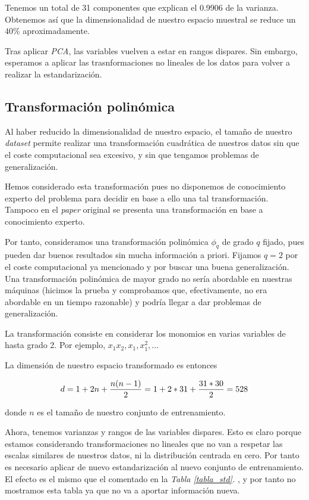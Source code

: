\documentclass[11pt]{article}
\begin{document}
Tenemos un total de 31 componentes que explican el 0.9906 de la varianza. Obtenemos así que la dimensionalidad de nuestro espacio muestral se reduce un $40\%$ aproximadamente.

Tras aplicar \emph{PCA}, las variables vuelven a estar en rangos dispares. Sin embargo, esperamos a aplicar las trasnformaciones no lineales de los datos para volver a realizar la estandarización.

\subsection{Transformación polinómica}

Al haber reducido la dimensionalidad de nuestro espacio, el tamaño de nuestro \emph{dataset} permite realizar una transformación cuadrática de nuestros datos sin que el coste computacional sea excesivo, y sin que tengamos problemas de generalización.

Hemos considerado esta transformación pues no disponemos de conocimiento experto del problema para decidir en base a ello una tal transformación. Tampoco en el \emph{paper} original \cite{original_paper:paper} se presenta una transformación en base a conocimiento experto.

Por tanto, consideramos una transformación polinómica $\phi_q$ de grado $q$ fijado, pues pueden dar buenos resultados sin mucha información a priori. Fijamos $q=2$ por el coste computacional ya mencionado y por buscar una buena generalización. Una transformación polinómica de mayor grado no sería abordable en nuestras máquinas (hicimos la prueba y comprobamos que, efectivamente, no era abordable en un tiempo razonable) y podría llegar a dar problemas de generalización.

La transformación consiste en considerar los monomios en varias variables de hasta grado 2. Por ejemplo, $x_1 x_2, x_1, x_1^2, \ldots$

La dimensión de nuestro espacio transformado es entonces

$$d = {1+2n}+{{n(n-1)}\over{2}} = {1+2*31}+{{31*30}\over{2}} = 528$$

donde $n$ es el tamaño de nuestro conjunto de entrenamiento.

Ahora, tenemos varianzas y rangos de las variables dispares. Esto es claro porque estamos considerando transformaciones no lineales que no van a respetar las escalas similares de nuestros datos, ni la distribución centrada en cero. Por tanto es necesario aplicar de nuevo estandarización al nuevo conjunto de entrenamiento. El efecto es el mismo que el comentado en la \emph{Tabla \ref{tabla_std}. }, y por tanto no mostramos esta tabla ya que no va a aportar información nueva.
\end{document}

